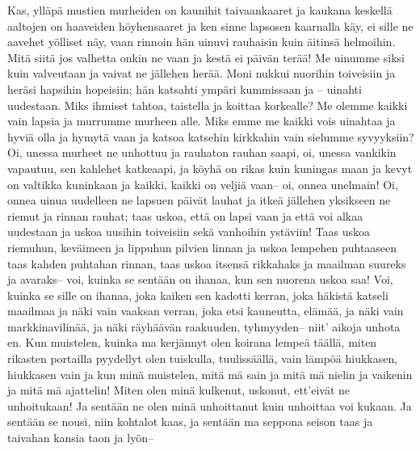     Kas, ylläpä mustien murheiden
    on kaunihit taivaankaaret
    ja kaukana keskellä aaltojen
    on haaveiden höyhensaaret
    ja ken sinne lapsosen kaarnalla käy,
    ei sille ne aavehet yölliset näy,
    vaan rinnoin hän uinuvi rauhaisin
    kuin äitinsä helmoihin.
  \endverse
  \beginverse
    Mitä siitä jos valhetta onkin ne vaan
    ja kestä ei päivän terää!
    Me uinumme siksi kuin valveutaan
    ja vaivat ne jällehen herää.
    Moni nukkui nuorihin toiveisiin
    ja heräsi hapsihin hopeisiin;
    hän katsahti ympäri kummissaan
    ja -- uinahti uudestaan.
    Miks ihmiset tahtoa, taistella
    ja koittaa korkealle?
    Me olemme kaikki vain lapsia
    ja murrumme murheen alle.
    Miks emme me kaikki vois uinahtaa
    ja hyviä olla ja hymytä vaan
    ja katsoa katsehin kirkkahin
    vain sielumme syvyyksiin?
  \endverse
  \beginverse
    Oi, unessa murheet ne unhottuu
    ja rauhaton rauhan saapi,
    oi, unessa vankikin vapautuu,
    sen kahlehet katkeaapi,
    ja köyhä on rikas kuin kuningas maan
    ja kevyt on valtikka kuninkaan
    ja kaikki, kaikki on veljiä vaan--
    oi, onnea unelmain!
  \endverse
  \beginverse
    Oi, onnea uinua uudelleen
    ne lapsuen päivät lauhat
    ja itkeä jällehen yksikseen
    ne riemut ja rinnan rauhat;
    taas uskoa, että on lapsi vaan
    ja että voi alkaa uudestaan
    ja uskoa uusihin toiveisiin
    sekä vanhoihin ystäviin!
  \endverse
  \beginverse
    Taas uskoa riemuhun, keväimeen
    ja lippuhun pilvien linnan
    ja uskoa lempehen puhtaaseen
    taas kahden puhtahan rinnan,
    taas uskoa itsensä rikkahaks
    ja maailman suureks ja avaraks--
    voi, kuinka se sentään on ihanaa,
    kun sen nuorena uskoa saa!
  \endverse
  \beginverse
    Voi, kuinka se sille on ihanaa,
    joka kaiken sen kadotti kerran,
    joka häkistä katseli maailmaa
    ja näki vain vaaksan verran,
    joka etsi kauneutta, elämää,
    ja näki vain markkinavilinää,
    ja näki räyhäävän raakuuden, tyhmyyden--
    niit' aikoja unhota en.
  \endverse
  \beginverse
    Kun muistelen, kuinka ma kerjännyt
    olen koirana lempeä täällä,
    miten rikasten portailla pyydellyt
    olen tuiskulla, tuulissäällä,
    vain lämpöä hiukkasen, hiukkasen vain
    ja kun minä muistelen, mitä mä sain
    ja mitä mä nielin ja vaikenin
    ja mitä mä ajattelin!
  \endverse
  \beginverse
    Miten olen minä kulkenut, uskonut,
    ett'eivät ne unhoitukaan!
    Ja sentään ne olen minä unhoittanut
    kuin unhoittaa voi kukaan.
    Ja sentään se nousi, niin kohtalot kaas,
    ja sentään ma seppona seison taas
    ja taivahan kansia taon ja lyön--
